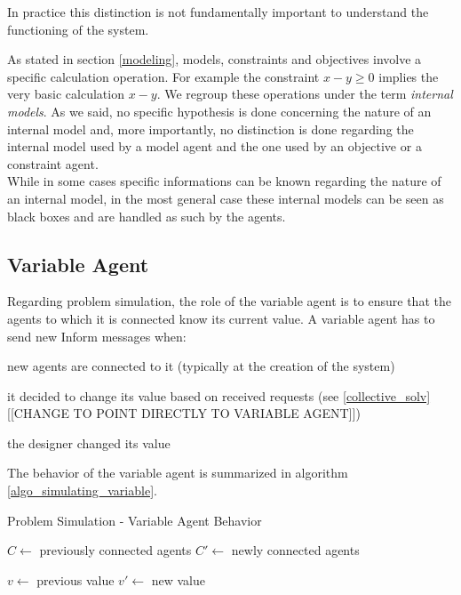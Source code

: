 In practice this distinction is not fundamentally important to understand the functioning of the system.

As stated in section \ref{modeling}, models, constraints and objectives involve a specific calculation operation. For example the constraint $x -y \geq 0$ implies the very basic calculation $x - y$. We regroup these operations under the term \emph{internal models}. As we said, no specific hypothesis is done concerning the nature of an internal model and, more importantly, no distinction is done regarding the internal model used by a model agent and the one used by an objective or a constraint agent.\\
While in some cases specific informations can be known regarding the nature of an internal model, in the most general case these internal models can be seen as black boxes and are handled as such by the agents.

\subsection{Variable Agent}

Regarding problem simulation, the role of the variable agent is to ensure that the agents to which it is connected know its current value.
A variable agent has to send new Inform messages when:
\begin{compactitem}
\item new agents are connected to it (typically at the creation of the system)
\item it decided to change its value based on received requests (see \ref{collective_solv}[[CHANGE TO POINT DIRECTLY TO VARIABLE AGENT]])
\item the designer changed its value
\end{compactitem}

The behavior of the variable agent is summarized in algorithm \ref{algo_simulating_variable}.

\begin{algorithm}
\caption{Problem Simulation - Variable Agent Behavior}
\label{algo_simulating_variable}
\begin{algorithmic}
	$C \leftarrow$ previously connected agents\;
	$C'\leftarrow$  newly connected agents\;
		
	$v \leftarrow$ previous value\;
	$v'\leftarrow$ new value\;
	
	
	
\end{algorithmic}
\end{algorithm}


